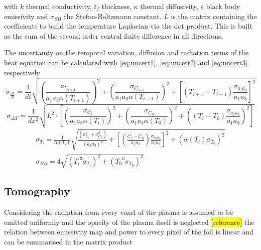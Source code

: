 with $k$ thermal conductivity, $t_f$  thickness, $\kappa$ thermal diffusivity, $\varepsilon$ black body emissivity and $\sigma_{SB}$ the Stefan-Boltzmann constant. $L$ is the matrix containing the coefficients to build the temperature Laplacian via the dot product. This is built as the sum of the second order central finite difference in all directions.

The uncertainty on the temporal variation, diffusion and radiation terms of the heat equation can be calculated with \autoref{eq:uncert1}, \ref{eq:uncert2} and \ref{eq:uncert3} respectively
\begin{equation}
{\sigma }_{ \frac {\partial T} {\partial t}} = \frac 1 {dt}  \sqrt{ \left ( \frac {{\sigma }_{C_{i+1}}} { a_1 a_3 \alpha(T_{i+1}) } \right )^2 + \left ( \frac {{\sigma }_{C_{i-1}}} { a_1 a_3 \alpha(T_{i-1}) } \right )^2 + \left [ \left ( T_{i+1}-T_{i-1} \right ) \frac {{\sigma }_{a_1 a_3}} {a_1 a_3} \right ]^2 } 
\label{eq:uncert1}
\end{equation}
\begin{equation}
{\sigma }_{ \Delta T} = \frac {1} {dx^2} \sqrt{ L^2 \cdot \left[  \left(  \frac {{\sigma }_{C_i}} { a_1 a_3 \alpha(T_i) } \right)^2 + \left( \frac {{\sigma }_{C_0}} { a_1 a_3 \alpha(T_0) } \right)^2 + \left( ({T_i -T_0}) \frac {{\sigma }_{a_1 a_3}} {a_1 a_3} \right)^2 \right] } 
\label{eq:uncert2}
\end{equation}\begin{equation}
\begin{split}
{\sigma }_{T_i} = \frac 1 {\alpha(T_i)} \sqrt{ \frac {({\sigma }_{C_i}^2 + {\sigma }_{C_0}^2 )} { (a_1 a_3)^2 } + \left [ \left (\frac {C_i -C_0} {a_1 a_3} \right ) \frac {{\sigma }_{a_1 a_3}} {a_1 a_3} \right ]^2  + (\alpha(T_i) {\sigma }_{T_0})^2 } \\ {\sigma }_{ BB} = 4 \sqrt{ ({T_i}^3 {\sigma }_{T_i})^2 + ({T_0}^3 {\sigma }_{T_0})^2 }
\label{eq:uncert3}
\end{split}
\end{equation}


\subsection{Tomography}
Considering the radiation from every voxel of the plasma is assumed to be emitted uniformly and the opacity of the plasma itself is neglected \hl{[reference]} the relation between emissivity map and power to every pixel of the foil is linear and can be summarised in the matrix product

